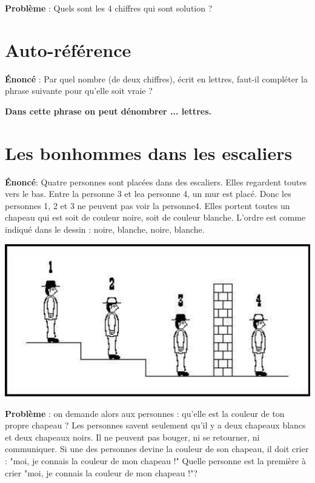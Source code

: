 \documentclass{article}
\begin{document}
\textbf{Problème }:  Quels sont les 4 chiffres qui sont solution ? \\
 
 
  
\section{Auto-référence} 
\textbf{Énoncé }: Par quel nombre (de deux chiffres), écrit en lettres, faut-il compléter la phrase suivante pour qu'elle soit vraie ? \\
\begin{center}
	\textbf{Dans cette phrase on peut dénombrer ... lettres. }
\end{center}
  
  
\section{Les bonhommes dans les escaliers}

\textbf{Énoncé}: Quatre personnes sont placées dans des escaliers. Elles regardent toutes vers le bas. Entre la personne 3 et lea personne 4, un mur est placé. Donc les personnes 1, 2 et 3 ne peuvent pas voir la personne4. Elles portent toutes un chapeau qui est soit de couleur noire, soit de couleur blanche. L'ordre est comme indiqué dans le dessin : noire, blanche, noire, blanche.

\begin{center}
	\includegraphics[scale=0.3]{Figures/Bonhommes.png} 
\end{center}

\textbf{Problème }: on demande alors aux personnes : qu'elle est la couleur de ton propre chapeau ? Les personnes savent seulement qu'il y a deux chapeaux blancs et deux chapeaux noirs. Il ne peuvent pas bouger, ni se retourner, ni communiquer. Si une des personnes devine la couleur de son chapeau, il doit crier : "moi, je connais la couleur de mon chapeau !"
Quelle personne est la première à crier "moi, je connais la couleur de mon chapeau !"?
\end{document}
